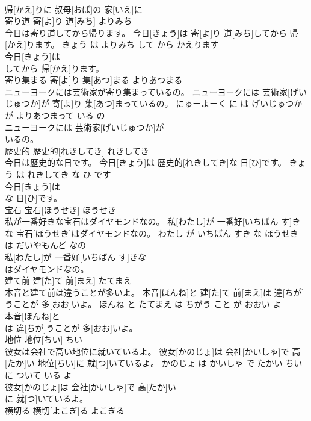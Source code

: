 \documentclass[8pt]{extreport}
\begin{document}
\begin{CJK}{UTF8}{min}
\\	帰[かえ]りに 叔母[おば]の 家[いえ]に
\\	寄り道	寄[よ]り 道[みち]	よりみち	
\\	今日は寄り道してから帰ります。	今日[きょう]は 寄[よ]り 道[みち]してから 帰[かえ]ります。	きょう は よりみち して から かえります	
\\	今日[きょう]は
\\	してから 帰[かえ]ります。			
\\	寄り集まる	寄[よ]り 集[あつ]まる	よりあつまる	
\\	ニューヨークには芸術家が寄り集まっているの。	ニューヨークには 芸術家[げいじゅつか]が 寄[よ]り 集[あつ]まっているの。	にゅーよーく に は げいじゅつか が よりあつまって いる の	
\\	ニューヨークには 芸術家[げいじゅつか]が
\\	いるの。			
\\	歴史的	歴史的[れきしてき]	れきしてき	
\\	今日は歴史的な日です。	今日[きょう]は 歴史的[れきしてき]な 日[ひ]です。	きょう は れきしてき な ひ です	
\\	今日[きょう]は
\\	な 日[ひ]です。			
\\	宝石	宝石[ほうせき]	ほうせき	
\\	私が一番好きな宝石はダイヤモンドなの。	私[わたし]が 一番好[いちばん す]きな 宝石[ほうせき]はダイヤモンドなの。	わたし が いちばん すき な ほうせき は だいやもんど なの	
\\	私[わたし]が 一番好[いちばん す]きな
\\	はダイヤモンドなの。			
\\	建て前	建[た]て 前[まえ]	たてまえ	
\\	本音と建て前は違うことが多いよ。	本音[ほんね]と 建[た]て 前[まえ]は 違[ちが]うことが 多[おお]いよ。	ほんね と たてまえ は ちがう こと が おおい よ	
\\	本音[ほんね]と
\\	は 違[ちが]うことが 多[おお]いよ。			
\\	地位	地位[ちい]	ちい	
\\	彼女は会社で高い地位に就いているよ。	彼女[かのじょ]は 会社[かいしゃ]で 高[たか]い 地位[ちい]に 就[つ]いているよ。	かのじょ は かいしゃ で たかい ちい に ついて いる よ	
\\	彼女[かのじょ]は 会社[かいしゃ]で 高[たか]い
\\	に 就[つ]いているよ。			
\\	横切る	横切[よこぎ]る	よこぎる	

\end{CJK}
\end{document}
